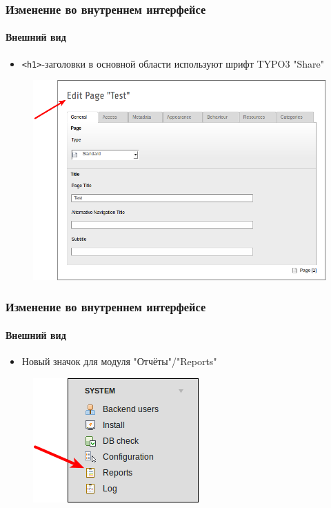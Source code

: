 
\begin{frame}[fragile]
	\frametitle{Изменение во внутреннем интерфейсе}
	\framesubtitle{Внешний вид}

	\begin{itemize}
		\item \texttt{<h1>}-заголовки в основной области используют шрифт TYPO3 "Share"
	\end{itemize}

	\begin{figure}
		\includegraphics[width=0.6\linewidth]{Images/BackendChanges/ConsistantFont.png}
	\end{figure}

\end{frame}


\begin{frame}[fragile]
	\frametitle{Изменение во внутреннем интерфейсе}
	\framesubtitle{Внешний вид}

	\begin{itemize}
		\item Новый значок для модуля "Отчёты"/"Reports"
	\end{itemize}

	\begin{figure}
		\includegraphics[width=0.35\linewidth]{Images/BackendChanges/ModuleReportsIcon.png}
	\end{figure}

\end{frame}

